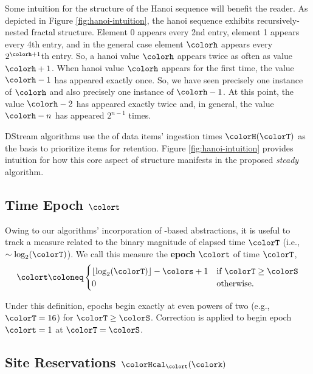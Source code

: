 Some intuition for the structure of the Hanoi sequence will benefit the reader.
As depicted in Figure \ref{fig:hanoi-intuition}, the hanoi sequence exhibits recursively-nested fractal structure.
Element 0 appears every 2nd entry, element 1 appears every 4th entry, and in the general case element $\colorh$ appears every $2^{\colorh+1}$th entry.
So, a hanoi value $\colorh$ appears twice as often as value $\colorh + 1$.
When hanoi value $\colorh$ appears for the first time, the value $\colorh - 1$ has appeared exactly once.
So, we have seen precisely one instance of $\colorh$ and also precisely one instance of $\colorh - 1$.
At this point, the value $\colorh - 2$ has appeared exactly twice and, in general, the value $\colorh - n$ has appeared $2^{n - 1}$ times.

DStream algorithms use the \hv{} of data items' ingestion times $\colorH(\colorT)$ as the basis to prioritize items for retention.
Figure \ref{fig:hanoi-intuition} provides intuition for how this core aspect of structure manifests in the proposed \textit{steady} algorithm.



\subsection{Time Epoch $\colort$}
\label{sec:notation-epoch}

Owing to our algorithms' incorporation of \hv{}-based abstractions, it is useful to track a measure related to the binary magnitude of elapsed time $\colorT$ (i.e., $\sim \log_2(\colorT)$).
We call this measure the \textbf{epoch} $\colort$ of time $\colorT$,
\begin{equation}
\colort
\coloneq
\begin{cases}
\left\lfloor \log_2(\colorT) \right\rfloor - \colors + 1 & \text{if $\colorT \geq \colorS$} \\
0 & \text{otherwise.}
\end{cases}
\label{eqn:epoch-defn}
\end{equation}

Under this definition, epochs begin exactly at even powers of two (e.g., $\colorT = 16$) for $\colorT \geq \colorS$.
Correction is applied to begin epoch $\colort=1$ at $\colorT = \colorS$.

\subsection{Site Reservations $\colorHcal_{\colort}(\colork)$}
\label{sec:notation-reservation}

